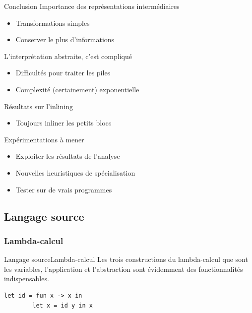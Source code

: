 \documentclass{beamer}
\begin{document}
\begin{frame}{Conclusion}
    Importance des représentations intermédiaires

    \begin{itemize}
        \item Transformations simples
        \item Conserver le plus d'informations
    \end{itemize}

    L'interprétation abstraite, c'est compliqué

    \begin{itemize}
        \item Difficultés pour traiter les piles
        \item Complexité (certainement) exponentielle
    \end{itemize}

    Résultats sur l'inlining

    \begin{itemize}
        \item Toujours inliner les petits blocs
    \end{itemize}

    Expérimentations à mener

    \begin{itemize}
        \item Exploiter les résultats de l'analyse
        \item Nouvelles heuristiques de spécialisation
        \item Tester sur de vrais programmes
    \end{itemize}
\end{frame}



\iffalse
\subsection{Langage source}

\subsubsection{Lambda-calcul}

\begin{frame}[fragile]{Langage source}{Lambda-calcul}
    Les trois constructions du lambda-calcul que sont les variables, l'application et l'abstraction sont évidemment des fonctionnalités indispensables.
    \begin{lstlisting}[language=caml]
        let id = fun x -> x in
        let x = id y in x
    \end{lstlisting}
\end{frame}
\end{document}
